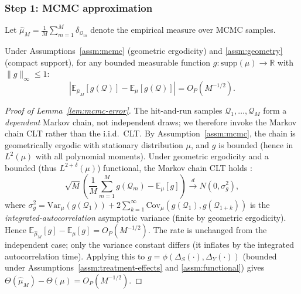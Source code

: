 \subsubsection{Step 1: MCMC approximation}

Let $\hat{\mu}_M = \frac{1}{M}\sum_{m=1}^M \delta_{\mathcal{Q}_m}$ denote the empirical measure over MCMC samples.

\begin{lemma}
\label{lem:mcmc-error}
Under Assumptions~\ref{assm:mcmc} (geometric ergodicity) and \ref{assm:geometry} (compact support), for any bounded measurable function $g: \text{supp}(\mu) \to \mathbb{R}$ with $\|g\|_\infty \leq 1$:
\begin{equation}
\left|\mathbb{E}_{\hat{\mu}_M}[g(\mathcal{Q})] - \mathbb{E}_{\mu}[g(\mathcal{Q})]\right| = O_P(M^{-1/2}).
\end{equation}
\end{lemma}

\begin{proof}[Proof of Lemma~\ref{lem:mcmc-error}]
The hit-and-run samples $\mathcal{Q}_1, \ldots, \mathcal{Q}_M$ form a \emph{dependent} Markov chain, not independent draws; we therefore invoke the Markov chain CLT rather than the i.i.d.\ CLT. By Assumption~\ref{assm:mcmc}, the chain is geometrically ergodic with stationary distribution $\mu$, and $g$ is bounded (hence in $L^2(\mu)$ with all polynomial moments). Under geometric ergodicity and a bounded (thus $L^{2+\delta}(\mu)$) functional, the Markov chain CLT holds \cite{jones2004markov, roberts2004general}:
\begin{equation}
\sqrt{M}\left(\frac{1}{M}\sum_{m=1}^M g(\mathcal{Q}_m) - \mathbb{E}_{\mu}[g]\right) \xrightarrow{d} N\!\left(0, \sigma_g^2\right),
\end{equation}
where $\sigma_g^2 = \mathrm{Var}_\mu(g(\mathcal{Q}_1)) + 2\sum_{k=1}^\infty \mathrm{Cov}_\mu(g(\mathcal{Q}_1), g(\mathcal{Q}_{1+k}))$ is the \emph{integrated-autocorrelation} asymptotic variance (finite by geometric ergodicity). Hence $\mathbb{E}_{\hat{\mu}_M}[g] - \mathbb{E}_{\mu}[g] = O_P(M^{-1/2})$. The rate is unchanged from the independent case; only the variance constant differs (it inflates by the integrated autocorrelation time). Applying this to $g = \phi(\Delta_S(\cdot), \Delta_Y(\cdot))$ (bounded under Assumptions~\ref{assm:treatment-effects} and \ref{assm:functional}) gives $\Theta(\hat{\mu}_M) - \Theta(\mu) = O_P(M^{-1/2})$.
\end{proof}

